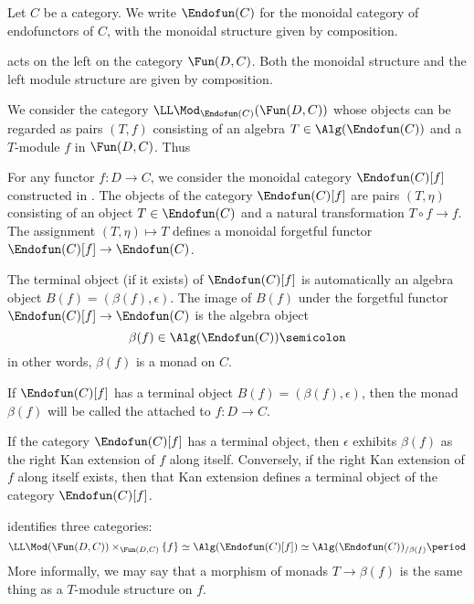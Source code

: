 \begin{construction}
	Let $ C $ be a category.
	We write $ \Endofun(C) $ for
	the monoidal category of endofunctors of $ C $,
	with the monoidal structure given by composition.

	acts on the left on the category $ \Fun(D, C) $.
	Both the monoidal structure and
	the left module structure
	are given by composition.

	We consider the category $ \LL\Mod_{\Endofun(C)}(\Fun(D,C)) $
	whose objects can be regarded as pairs $ (T, f ) $
	consisting of an algebra $ T \in \Alg(\Endofun(C)) $
	and a $ T $-module $ f $ in $ \Fun(D,C) $.
	Thus 

	For any functor $ f \colon D \to C $,
	we consider the monoidal category $ \Endofun(C)[f] $
	constructed in
	\cite[Definition 4.7.1.1]{Lurie2017}.
	The objects of the category $ \Endofun(C)[f] $
	are pairs $ (T, \eta) $ consisting of
	an object $ T \in \Endofun(C) $
	and a natural transformation $ T \circ f \to f $.
	The assignment $ (T, \eta) \mapsto T $ defines a 
	monoidal forgetful functor
	$ \Endofun(C)[f] \to \Endofun(C) $.

	The terminal object
	(if it exists)
	of $ \Endofun(C)[f] $ is automatically
	an algebra object $ B(f) = (\beta(f), \epsilon)$.
	The image of $ B(f) $ under
	the forgetful functor $ \Endofun(C)[f] \to \Endofun(C) $ is
	the algebra object
	\[
		\beta(f) \in \Alg(\Endofun(C)) \semicolon
	\]
	in other words, $ \beta(f) $ is a monad on $ C $.
	
	If $ \Endofun(C)[f] $ has
	a terminal object $ B(f) = (\beta(f), \epsilon)$,
	then the monad $ \beta(f) $ will be called the
	attached to $ f \colon D \to C $.

	If the category $ \Endofun(C)[f] $ has a terminal object,
	then $ \epsilon $ exhibits
	$ \beta(f) $ as the right Kan extension of $ f $
	along itself.
	Conversely, if the right Kan extension
	of $ f $ along itself exists,
	then that Kan extension defines a terminal object of
	the category $ \Endofun(C)[f] $.

	\cite[\S\S 4.7.1]{Lurie2017} identifies three categories:
	\[
		\LL\Mod(\Fun(D,C)) \times_{\Fun(D,C)} \left\{f\right\} \simeq
		\Alg(\Endofun(C)[f]) \simeq
		\Alg(\Endofun(C))_{/\beta(f)} \period
	\]
	More informally, we may say that
	a morphism of monads $ T \to \beta(f) $
	is the same thing as a $ T $-module structure on $ f $.
\end{construction}

